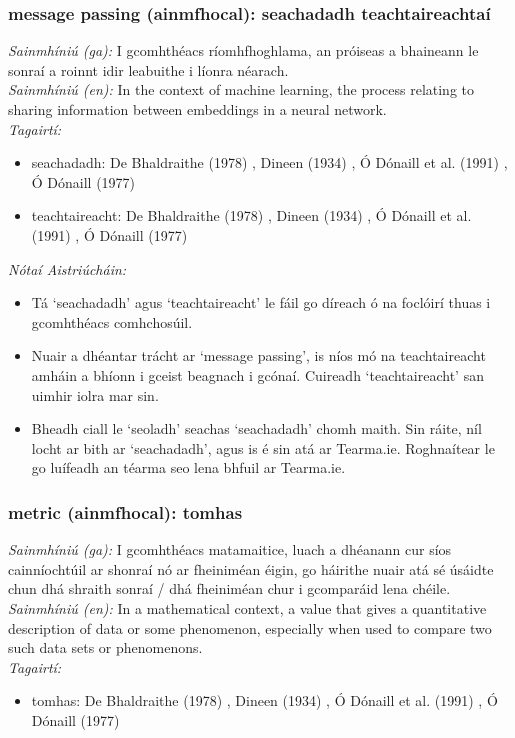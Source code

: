 \subsubsection*{message passing (ainmfhocal): seachadadh teachtaireachtaí}
 \noindent \textit{Sainmhíniú (ga):} I gcomhthéacs ríomhfhoghlama, an próiseas a bhaineann le sonraí a roinnt idir leabuithe i líonra néarach.
\\
 \noindent \textit{Sainmhíniú (en):} In the context of machine learning, the process relating to sharing information between embeddings in a neural network.
\\
 \noindent \textit{Tagairtí:}
\begin{itemize}
	\item seachadadh: De Bhaldraithe (1978) \cite{de-bhaldraithe}, Dineen (1934) \cite{dineen}, Ó Dónaill et al. (1991) \cite{focloir-beag}, Ó Dónaill (1977) \cite{odonaill}
	\item teachtaireacht: De Bhaldraithe (1978) \cite{de-bhaldraithe}, Dineen (1934) \cite{dineen}, Ó Dónaill et al. (1991) \cite{focloir-beag}, Ó Dónaill (1977) \cite{odonaill}
\end{itemize}

 \noindent \textit{Nótaí Aistriúcháin:}
\begin{itemize}
	\item Tá `seachadadh' agus `teachtaireacht' le fáil go díreach ó na foclóirí thuas i gcomhthéacs comhchosúil.
	\item Nuair a dhéantar trácht ar `message passing', is níos mó na teachtaireacht amháin a bhíonn i gceist beagnach i gcónaí. Cuireadh `teachtaireacht' san uimhir iolra mar sin.
	\item Bheadh ciall le `seoladh' seachas `seachadadh' chomh maith. Sin ráite, níl locht ar bith ar `seachadadh', agus is é sin atá ar Tearma.ie. Roghnaítear le go luífeadh an téarma seo lena bhfuil ar Tearma.ie.
\end{itemize}


\subsubsection*{metric (ainmfhocal): tomhas}
 \noindent \textit{Sainmhíniú (ga):} I gcomhthéacs matamaitice, luach a dhéanann cur síos cainníochtúil ar shonraí nó ar fheiniméan éigin, go háirithe nuair atá sé úsáidte chun dhá shraith sonraí / dhá fheiniméan chur i gcomparáid lena chéile.
\\
 \noindent \textit{Sainmhíniú (en):} In a mathematical context, a value that gives a quantitative description of data or some phenomenon, especially when used to compare two such data sets or phenomenons.
\\
 \noindent \textit{Tagairtí:}
\begin{itemize}
	\item tomhas: De Bhaldraithe (1978) \cite{de-bhaldraithe}, Dineen (1934) \cite{dineen}, Ó Dónaill et al. (1991) \cite{focloir-beag}, Ó Dónaill (1977) \cite{odonaill}
\end{itemize}

